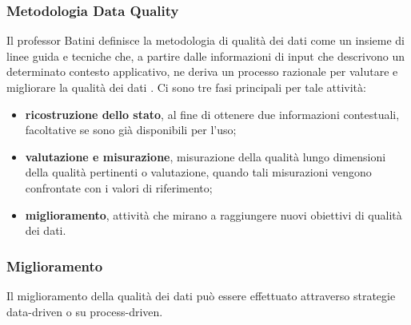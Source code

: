 \documentclass[a4paper,12pt]{article}
\begin{document}
\subsubsection{Metodologia Data Quality}

Il professor Batini definisce la metodologia di qualità dei dati come un insieme di linee guida e tecniche che, a partire dalle informazioni di input che descrivono un determinato contesto applicativo, ne deriva un processo razionale per valutare e migliorare la qualità dei dati \cite{10.1145/1541880.1541883}. Ci sono tre fasi principali per tale attività:
\begin{itemize}
\item \textbf{ricostruzione dello stato}, al fine di ottenere due informazioni contestuali, facoltative se sono già disponibili per l'uso;
\item \textbf{valutazione e misurazione}, misurazione della qualità lungo dimensioni della qualità pertinenti o valutazione, quando tali misurazioni vengono confrontate con i valori di riferimento;
\item \textbf{miglioramento}, attività che mirano a raggiungere nuovi obiettivi di qualità dei dati.
\end{itemize}

\subsubsection{Miglioramento}
Il miglioramento della qualità dei dati può essere effettuato attraverso strategie data-driven o su process-driven.
\end{document}
